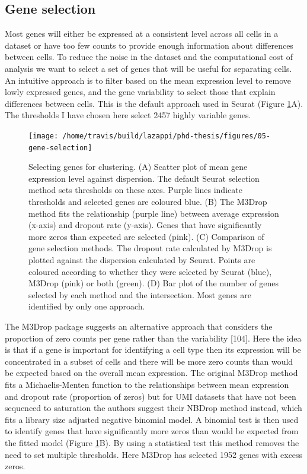 \documentclass[11pt,a4paper,titlepage,twoside,openright]{style/unimelbthesis}
\theoremstyle{definition}
\theoremstyle{definition}
\theoremstyle{definition}
\theoremstyle{remark}
\begin{document}
\begin{mainmatter}
\hypertarget{gene-selection}{%
\subsection{Gene selection}\label{gene-selection}}

Most genes will either be expressed at a consistent level across all cells in a dataset or have too few counts to provide enough information about differences between cells. To reduce the noise in the dataset and the computational cost of analysis we want to select a set of genes that will be useful for separating cells. An intuitive approach is to filter based on the mean expression level to remove lowly expressed genes, and the gene variability to select those that explain differences between cells. This is the default approach used in Seurat (Figure \ref{fig:gene-selection}A). The thresholds I have chosen here select 2457 highly variable genes.

\begin{figure}

{\centering \texttt{[image: /home/travis/build/lazappi/phd-thesis/figures/05-gene-selection]} 

}

\caption[Selecting genes for clustering.]{Selecting genes for clustering. (A) Scatter plot of mean gene expression level against dispersion. The default Seurat selection method sets thresholds on these axes. Purple lines indicate thresholds and selected genes are coloured blue. (B) The M3Drop method fits the relationship (purple line) between average expression (x-axis) and dropout rate (y-axis). Genes that have significantly more zeros than expected are selected (pink). (C) Comparison of gene selection methods. The dropout rate calculated by M3Drop is plotted against the dispersion calculated by Seurat. Points are coloured according to whether they were selected by Seurat (blue), M3Drop (pink) or both (green). (D) Bar plot of the number of genes selected by each method and the intersection. Most genes are identified by only one approach.}\label{fig:gene-selection}
\end{figure}





The M3Drop package suggests an alternative approach that considers the proportion of zero counts per gene rather than the variability {[}104{]}. Here the idea is that if a gene is important for identifying a cell type then its expression will be concentrated in a subset of cells and there will be more zero counts than would be expected based on the overall mean expression. The original M3Drop method fits a Michaelis-Menten function to the relationships between mean expression and dropout rate (proportion of zeros) but for UMI datasets that have not been sequenced to saturation the authors suggest their NBDrop method instead, which fits a library size adjusted negative binomial model. A binomial test is then used to identify genes that have significantly more zeros than would be expected from the fitted model (Figure \ref{fig:gene-selection}B). By using a statistical test this method removes the need to set multiple thresholds. Here M3Drop has selected 1952 genes with excess zeros.


\end{mainmatter}
\end{document}
